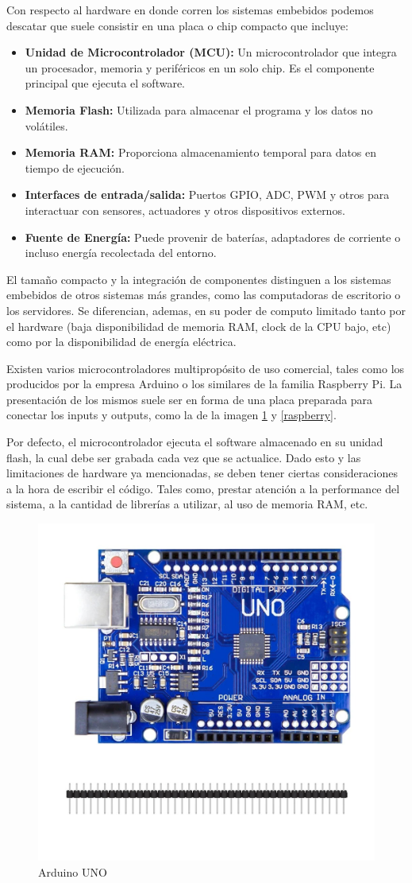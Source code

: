 Con respecto al hardware en donde corren los sistemas embebidos podemos descatar que suele consistir en una placa o chip compacto que incluye:
\begin{itemize}
    \item \textbf{Unidad de Microcontrolador (MCU):} Un microcontrolador que integra un procesador, memoria y perif\'ericos en un solo chip. Es el componente principal que ejecuta el software.
    \item \textbf{Memoria Flash:} Utilizada para almacenar el programa y los datos no vol\'atiles.
    \item \textbf{Memoria RAM:} Proporciona almacenamiento temporal para datos en tiempo de ejecuci\'on.
    \item \textbf{Interfaces de entrada/salida:} Puertos \gls{GPIO}, \gls{ADC}, \gls{PWM} y otros para interactuar con sensores, actuadores y otros dispositivos externos.
    \item \textbf{Fuente de Energ\'ia:} Puede provenir de bater\'ias, adaptadores de corriente o incluso energ\'ia recolectada del entorno.
\end{itemize}
El tama\~no compacto y la integraci\'on de componentes distinguen a los sistemas embebidos de otros sistemas m\'as grandes, como las computadoras de escritorio o los servidores. Se diferencian, ademas, en su poder de computo limitado tanto por el hardware (baja disponibilidad de memoria RAM, \gls{clock} de la CPU bajo, etc) como por la disponibilidad de energía eléctrica.

Existen varios microcontroladores multipropósito de uso comercial, tales como los producidos por la empresa Arduino o los similares de la familia  Raspberry Pi. La presentación de los mismos suele ser en forma de una placa preparada para conectar los inputs y outputs, como la de la imagen \ref{arduinoUNO} y \ref{raspberry}.

Por defecto, el microcontrolador ejecuta el software almacenado en su unidad flash, la cual debe ser grabada cada vez que se actualice. Dado esto y las limitaciones de hardware ya mencionadas, se deben tener ciertas consideraciones a la hora de escribir el código. Tales como, prestar atención a la performance del sistema, a la cantidad de librerías a utilizar, al uso de memoria RAM, etc.

\begin{figure}[h!]
	\label{arduinoUNO}
	\centering
    \includegraphics[width=0.5\linewidth]{arduinoUNO.jpeg}
    \caption{Arduino UNO}
\end{figure}


